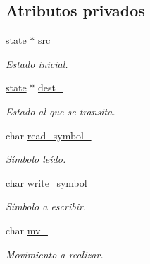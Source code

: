 \subsection*{Atributos privados}
\begin{DoxyCompactItemize}
\item 
\hypertarget{classtransition__t_a7dd43b71a5592511682d1055bacc4e30}{}\hyperlink{classstate}{state} $\ast$ \hyperlink{classtransition__t_a7dd43b71a5592511682d1055bacc4e30}{src\+\_\+}\label{classtransition__t_a7dd43b71a5592511682d1055bacc4e30}

\begin{DoxyCompactList}\small\item\em Estado inicial. \end{DoxyCompactList}\item 
\hypertarget{classtransition__t_aa8b498692df1561ff2ca6a8146438a6b}{}\hyperlink{classstate}{state} $\ast$ \hyperlink{classtransition__t_aa8b498692df1561ff2ca6a8146438a6b}{dest\+\_\+}\label{classtransition__t_aa8b498692df1561ff2ca6a8146438a6b}

\begin{DoxyCompactList}\small\item\em Estado al que se transita. \end{DoxyCompactList}\item 
\hypertarget{classtransition__t_ad5e12d9b149fda53f00fce60ae649b98}{}char \hyperlink{classtransition__t_ad5e12d9b149fda53f00fce60ae649b98}{read\+\_\+symbol\+\_\+}\label{classtransition__t_ad5e12d9b149fda53f00fce60ae649b98}

\begin{DoxyCompactList}\small\item\em Símbolo leído. \end{DoxyCompactList}\item 
\hypertarget{classtransition__t_a489c4e2507e36c7abe5d86a2abbbb4ec}{}char \hyperlink{classtransition__t_a489c4e2507e36c7abe5d86a2abbbb4ec}{write\+\_\+symbol\+\_\+}\label{classtransition__t_a489c4e2507e36c7abe5d86a2abbbb4ec}

\begin{DoxyCompactList}\small\item\em Símbolo a escribir. \end{DoxyCompactList}\item 
\hypertarget{classtransition__t_a7cb8be177964aa626e444022305adf79}{}char \hyperlink{classtransition__t_a7cb8be177964aa626e444022305adf79}{mv\+\_\+}\label{classtransition__t_a7cb8be177964aa626e444022305adf79}

\begin{DoxyCompactList}\small\item\em Movimiento a realizar. \end{DoxyCompactList}\end{DoxyCompactItemize}


